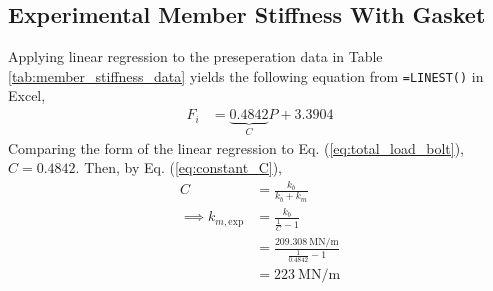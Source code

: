 \subsection{Experimental Member Stiffness With Gasket}
Applying linear regression to the preseperation data in Table \ref{tab:member_stiffness_data} yields the following equation from \texttt{=LINEST()} in Excel,
\begin{align*}
    F_i &= \underbrace{0.4842}_{C} P + 3.3904
\end{align*}
Comparing the form of the linear regression to Eq. (\ref{eq:total_load_bolt}), $C = 0.4842$. Then, by Eq. (\ref{eq:constant_C}),
\begin{align*}
    C &= \frac{k_b}{k_b + k_m} \\
    \implies k_{m, \text{exp}} &= \frac{k_b}{\frac{1}{C} - 1} \\
    &= \frac{\qty{209.308}{\mega\newton\per\meter}}{\frac{1}{0.4842} - 1} \\
    &= \boxed{\qty{223}{\mega\newton\per\meter}}
\end{align*}



